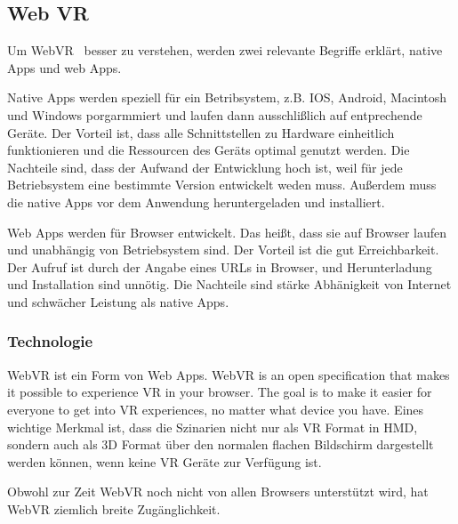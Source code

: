  \subsection{Web VR}
 Um \glqq WebVR \grqq\ besser zu verstehen, werden zwei relevante Begriffe erklärt, native Apps und web Apps.
 
 Native Apps werden speziell für ein Betribsystem, z.B. IOS, Android, Macintosh und Windows porgarmmiert und laufen dann ausschlißlich auf entprechende Geräte. Der Vorteil ist, \glqq dass alle Schnittstellen zu Hardware einheitlich funktionieren und die Ressourcen des Geräts optimal genutzt werden\grqq.\citep{22} Die Nachteile sind, dass der Aufwand der Entwicklung hoch ist, weil für jede Betriebsystem eine bestimmte Version entwickelt weden muss. Außerdem muss die native Apps vor dem Anwendung heruntergeladen und installiert.
 
 Web Apps werden für Browser entwickelt. Das heißt, dass sie auf Browser laufen und unabhängig von Betriebsystem sind. Der Vorteil ist die gut Erreichbarkeit. Der Aufruf ist durch der Angabe eines URLs in Browser, und Herunterladung und Installation sind unnötig. Die Nachteile sind stärke Abhänigkeit von Internet und schwächer Leistung als native Apps.
 
  \subsubsection{Technologie}
 WebVR ist ein Form von Web Apps. \glqq WebVR is an open specification that makes it possible to experience VR in your browser. The goal is to make it easier for everyone to get into VR experiences, no matter what device you have. \grqq \citep{21} Eines wichtige Merkmal ist, dass die Szinarien nicht nur als VR Format in HMD, sondern auch als 3D Format über den normalen flachen Bildschirm dargestellt werden können, wenn keine VR Geräte zur Verfügung ist.
 
 Obwohl zur Zeit WebVR noch nicht von allen Browsers unterstützt wird, hat WebVR ziemlich breite Zugänglichkeit.
 

